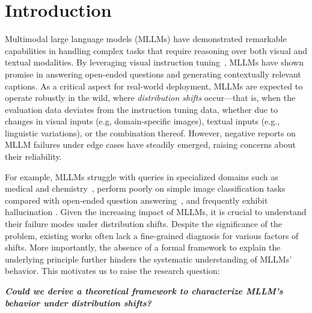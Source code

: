\section{Introduction} \label{sec:1_introduction}
Multimodal large language models (MLLMs) have demonstrated remarkable capabilities in handling complex tasks that require reasoning over both visual and textual modalities. By leveraging {visual instruction tuning}~\cite{liu2023visual,dai2023instructblip,zhu2024minigpt}, 
MLLMs have shown promise in answering open-ended questions and generating contextually relevant captions.
As a critical aspect for real-world deployment, MLLMs are expected to operate robustly in the wild, where \textit{distribution shifts} occur---that is, when the evaluation data deviates from the instruction tuning data, whether due to changes in visual inputs (e.g, domain-specific images), textual inputs (e.g., linguistic variations), or the combination thereof. However, negative reports on MLLM failures under edge cases have steadily emerged, raising concerns about their reliability. 


For example, MLLMs struggle with queries in specialized domains such as medical and chemistry~\cite{zhang2024out,han2024well,zhou2024adapting}, perform poorly on simple image classification tasks compared with open-ended question answering~\cite{zhang2024vlmclf, zhai2024investigating}, and frequently exhibit hallucination \cite{li2023evaluating, ye2025beaf}. Given the increasing impact of MLLMs, it is crucial to understand their failure modes under distribution shifts. 
Despite the significance of the problem, existing works often lack a fine-grained diagnosis for various factors of shifts. More importantly, the absence of a formal framework to explain the underlying principle further hinders the systematic understanding of MLLMs' behavior. This motivates us to raise the research question:
\begin{center}
    \textit{\textbf{Could we derive a theoretical framework to characterize MLLM's behavior under distribution shifts?}}
\end{center}

